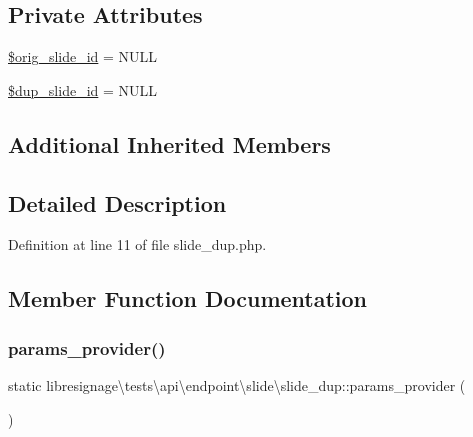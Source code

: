 \subsection*{Private Attributes}
\begin{DoxyCompactItemize}
\item 
\hyperlink{classlibresignage_1_1tests_1_1api_1_1endpoint_1_1slide_1_1slide__dup_a0626c490eb8b141e25a560951802fbe9}{\$orig\+\_\+slide\+\_\+id} = N\+U\+LL
\item 
\hyperlink{classlibresignage_1_1tests_1_1api_1_1endpoint_1_1slide_1_1slide__dup_aad0ec45dcdd48e0e42a128509bc9826b}{\$dup\+\_\+slide\+\_\+id} = N\+U\+LL
\end{DoxyCompactItemize}
\subsection*{Additional Inherited Members}


\subsection{Detailed Description}


Definition at line 11 of file slide\+\_\+dup.\+php.



\subsection{Member Function Documentation}
\mbox{\label{classlibresignage_1_1tests_1_1api_1_1endpoint_1_1slide_1_1slide__dup_a949f05abf135705ee2abdc426756f7fa}} 
\subsubsection{\texorpdfstring{params\+\_\+provider()}{params\_provider()}}
{\footnotesize\ttfamily static libresignage\textbackslash{}tests\textbackslash{}api\textbackslash{}endpoint\textbackslash{}slide\textbackslash{}slide\+\_\+dup\+::params\+\_\+provider (\begin{DoxyParamCaption}{ }\end{DoxyParamCaption})\hspace{0.3cm}{\ttfamily [static]}}



